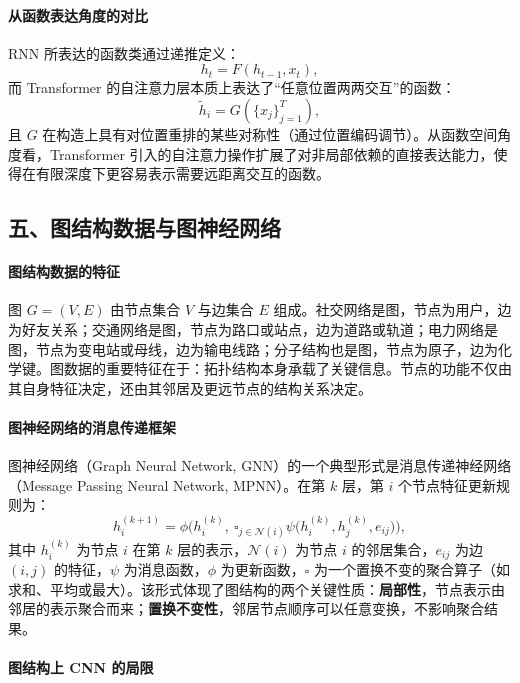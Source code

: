 \paragraph{从函数表达角度的对比}

RNN 所表达的函数类通过递推定义：
\[
h_t = F(h_{t-1}, x_t),
\]
而 Transformer 的自注意力层本质上表达了“任意位置两两交互”的函数：
\[
\tilde{h}_i = G\left(\{x_j\}_{j=1}^{T}\right),
\]
且 $G$ 在构造上具有对位置重排的某些对称性（通过位置编码调节）。从函数空间角度看，Transformer 引入的自注意力操作扩展了对非局部依赖的直接表达能力，使得在有限深度下更容易表示需要远距离交互的函数。

\subsection*{五、图结构数据与图神经网络}

\paragraph{图结构数据的特征}

图 $G = (V, E)$ 由节点集合 $V$ 与边集合 $E$ 组成。社交网络是图，节点为用户，边为好友关系；交通网络是图，节点为路口或站点，边为道路或轨道；电力网络是图，节点为变电站或母线，边为输电线路；分子结构也是图，节点为原子，边为化学键。图数据的重要特征在于：拓扑结构本身承载了关键信息。节点的功能不仅由其自身特征决定，还由其邻居及更远节点的结构关系决定。

\paragraph{图神经网络的消息传递框架}

图神经网络（Graph Neural Network, GNN）的一个典型形式是消息传递神经网络（Message Passing Neural Network, MPNN）。在第 $k$ 层，第 $i$ 个节点特征更新规则为：
\[
h_i^{(k+1)} = \phi\Big(h_i^{(k)},\ \square_{j\in\mathcal{N}(i)} \psi\big(h_i^{(k)}, h_j^{(k)}, e_{ij}\big)\Big),
\]
其中 $h_i^{(k)}$ 为节点 $i$ 在第 $k$ 层的表示，$\mathcal{N}(i)$ 为节点 $i$ 的邻居集合，$e_{ij}$ 为边 $(i,j)$ 的特征，$\psi$ 为消息函数，$\phi$ 为更新函数，$\square$ 为一个置换不变的聚合算子（如求和、平均或最大）。该形式体现了图结构的两个关键性质：\textbf{局部性}，节点表示由邻居的表示聚合而来；\textbf{置换不变性}，邻居节点顺序可以任意变换，不影响聚合结果。

\paragraph{图结构上 CNN 的局限}

